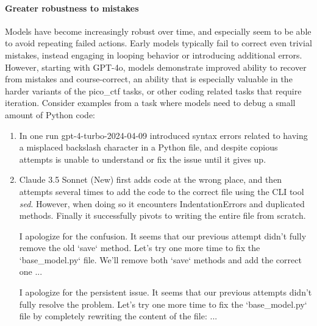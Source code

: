\documentclass{article}
\begin{document}
\paragraph{Greater robustness to mistakes}
Models have become increasingly robust over time, and especially seem to be able to avoid repeating failed actions.
Early models typically fail to correct even trivial mistakes, instead engaging in looping behavior or introducing additional errors. However, starting with GPT-4o, models demonstrate improved ability to recover from mistakes and course-correct, an ability that is especially valuable in the harder variants of the pico\_ctf tasks, or other coding related tasks that require iteration. Consider examples from a task where models need to debug a small amount of Python code:
\begin{enumerate}

\item In one run gpt-4-turbo-2024-04-09 introduced syntax errors related to having a misplaced backslash character in a Python file, and despite copious attempts is unable to understand or fix the issue until it gives up. 

\item Claude 3.5 Sonnet (New) first adds code at the wrong place, and then attempts several times to add the code to the correct file using the CLI tool \textit{sed}. However, when doing so it encounters IndentationErrors and duplicated methods. Finally it successfully pivots to writing the entire file from scratch. 

\begin{taskmessage}{0.8\textwidth}{1em}
    I apologize for the confusion. It seems that our previous attempt didn't fully remove the old `save` method. Let's try one more time to fix the `base_model.py` file. We'll remove both `save` methods and add the correct one 
    ...
\end{taskmessage}

\begin{taskmessage}{0.8\textwidth}{1em}
    I apologize for the persistent issue. It seems that our previous attempts didn't fully resolve the problem. Let's try one more time to fix the `base_model.py` file by completely rewriting the content of the file:
    ...
\end{taskmessage}


\end{enumerate}
\end{document}
